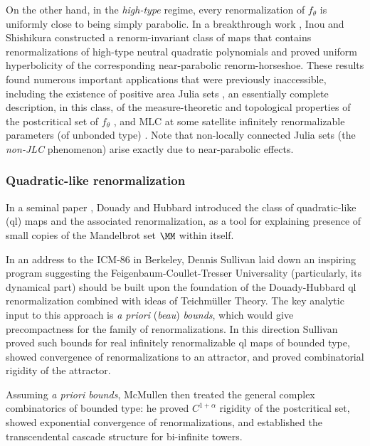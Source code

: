 \documentclass{amsart}
\begin{document}
On the other hand,
in the \emph{high-type} regime, every renormalization of $f_\theta$ is uniformly close to being simply parabolic. 
In a breakthrough work \cite{IS},
Inou and Shishikura  constructed a renorm-invariant class of maps that contains renormalizations of high-type neutral quadratic polynomials and proved uniform hyperbolicity of the corresponding near-parabolic renorm-horseshoe. 
These results found  numerous important applications that were previously inaccessible, 
including the existence of positive area Julia sets \cite{BC12, AL22}, 
an essentially complete description, in this class, 
of  the measure-theoretic and topological properties of the postcritical set of $f_\theta$ \cite{Che13, Che18, Che19, SY24, Che25}, 
and MLC at some satellite infinitely  renormalizable parameters (of unbonded type) \cite{CS15}. 
Note that non-locally connected Julia sets (the \emph{non-JLC} phenomenon) 
arise exactly due to near-parabolic effects.

\subsubsection{Quadratic-like renormalization}
\label{sss:ql-maps}

In a seminal paper \cite{DH85}, 
Douady and Hubbard  introduced the class of quadratic-like (ql) maps 
and the associated renormalization,
as a tool for explaining  presence of small copies of the Mandelbrot set $\MM$ within itself. 

In an address to the ICM-86 in Berkeley,
Dennis Sullivan \cite{SulICM} laid down an inspiring program  suggesting 
the Feigenbaum-Coullet-Tresser Universality  \cite{F1,F2,TC,CT}
(particularly, its dynamical part) should be built upon the foundation of
the Douady-Hubbard ql renormalization combined with ideas of Teichm\"uller Theory. 
The key analytic input to this approach is \emph{a priori} (\emph{beau}) \emph{bounds}, 
which would give precompactness for the family of renormalizations.
In this direction
Sullivan \cite{Sul92,dMvS93} proved such bounds for real infinitely renormalizable ql maps of bounded type, 
showed convergence of renormalizations to an attractor, 
and proved combinatorial rigidity of the attractor.

Assuming \emph{a priori bounds}, McMullen \cite{McM96} 
then treated the general complex combinatorics of bounded type: 
he proved $C^{1+\alpha}$ rigidity of the postcritical set, showed exponential convergence of renormalizations, and established the transcendental cascade structure for bi-infinite towers.
\end{document}
